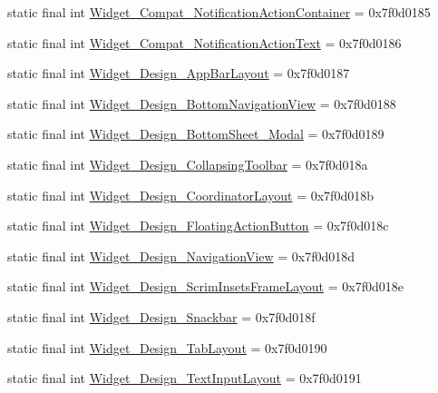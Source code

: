 \begin{DoxyCompactItemize}
\item 
static final int \mbox{\hyperlink{classandroid_1_1support_1_1design_1_1R_1_1style_abba9b87176bec9a05b6acfb262fda062}{Widget\+\_\+\+Compat\+\_\+\+Notification\+Action\+Container}} = 0x7f0d0185
\item 
static final int \mbox{\hyperlink{classandroid_1_1support_1_1design_1_1R_1_1style_a0686d695152f8ea685158d719675235e}{Widget\+\_\+\+Compat\+\_\+\+Notification\+Action\+Text}} = 0x7f0d0186
\item 
static final int \mbox{\hyperlink{classandroid_1_1support_1_1design_1_1R_1_1style_ac05746c2babe4cc3601d558ffdf6806d}{Widget\+\_\+\+Design\+\_\+\+App\+Bar\+Layout}} = 0x7f0d0187
\item 
static final int \mbox{\hyperlink{classandroid_1_1support_1_1design_1_1R_1_1style_a7692f87a9f20e874e0c34fb9a776dcc0}{Widget\+\_\+\+Design\+\_\+\+Bottom\+Navigation\+View}} = 0x7f0d0188
\item 
static final int \mbox{\hyperlink{classandroid_1_1support_1_1design_1_1R_1_1style_a25675d420751beca4e7777b3b4f3a6ff}{Widget\+\_\+\+Design\+\_\+\+Bottom\+Sheet\+\_\+\+Modal}} = 0x7f0d0189
\item 
static final int \mbox{\hyperlink{classandroid_1_1support_1_1design_1_1R_1_1style_ad5b861aa8579d0792ab299950a7e5203}{Widget\+\_\+\+Design\+\_\+\+Collapsing\+Toolbar}} = 0x7f0d018a
\item 
static final int \mbox{\hyperlink{classandroid_1_1support_1_1design_1_1R_1_1style_a29eed8aef81e32c9973e6dfcacb41857}{Widget\+\_\+\+Design\+\_\+\+Coordinator\+Layout}} = 0x7f0d018b
\item 
static final int \mbox{\hyperlink{classandroid_1_1support_1_1design_1_1R_1_1style_a08935d376825ff3b7d17aec27397cf9d}{Widget\+\_\+\+Design\+\_\+\+Floating\+Action\+Button}} = 0x7f0d018c
\item 
static final int \mbox{\hyperlink{classandroid_1_1support_1_1design_1_1R_1_1style_ab1b972b922c73220c4cbf8cd7c235fe7}{Widget\+\_\+\+Design\+\_\+\+Navigation\+View}} = 0x7f0d018d
\item 
static final int \mbox{\hyperlink{classandroid_1_1support_1_1design_1_1R_1_1style_a87e6d222c0aa6cdb22bd196a42738102}{Widget\+\_\+\+Design\+\_\+\+Scrim\+Insets\+Frame\+Layout}} = 0x7f0d018e
\item 
static final int \mbox{\hyperlink{classandroid_1_1support_1_1design_1_1R_1_1style_a39ee29a1451944b167ccbe405224a219}{Widget\+\_\+\+Design\+\_\+\+Snackbar}} = 0x7f0d018f
\item 
static final int \mbox{\hyperlink{classandroid_1_1support_1_1design_1_1R_1_1style_a4e18e9a3dd0772b01328ac0bb36863e7}{Widget\+\_\+\+Design\+\_\+\+Tab\+Layout}} = 0x7f0d0190
\item 
static final int \mbox{\hyperlink{classandroid_1_1support_1_1design_1_1R_1_1style_aa16e720283622554378e2d9ea5437fdf}{Widget\+\_\+\+Design\+\_\+\+Text\+Input\+Layout}} = 0x7f0d0191
\end{DoxyCompactItemize}



